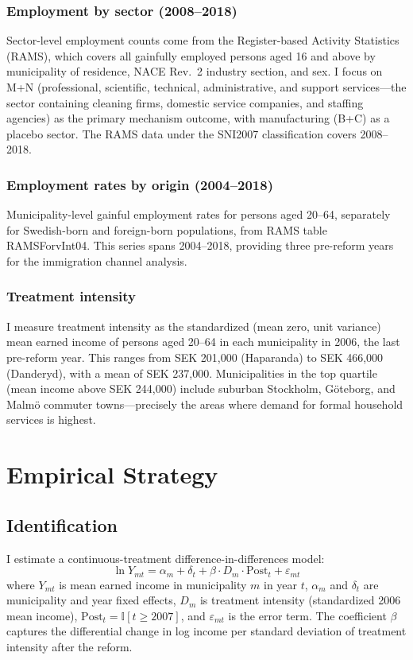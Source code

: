 \documentclass[12pt]{article}
\newcommand{\ind}{\mathbb{I}}
\begin{document}
\subsubsection*{Employment by sector (2008--2018)} Sector-level employment counts come from the Register-based Activity Statistics (RAMS), which covers all gainfully employed persons aged 16 and above by municipality of residence, NACE Rev.~2 industry section, and sex. I focus on M+N (professional, scientific, technical, administrative, and support services---the sector containing cleaning firms, domestic service companies, and staffing agencies) as the primary mechanism outcome, with manufacturing (B+C) as a placebo sector. The RAMS data under the SNI2007 classification covers 2008--2018.

\subsubsection*{Employment rates by origin (2004--2018)} Municipality-level gainful employment rates for persons aged 20--64, separately for Swedish-born and foreign-born populations, from RAMS table RAMSForvInt04. This series spans 2004--2018, providing three pre-reform years for the immigration channel analysis.

\subsubsection*{Treatment intensity} I measure treatment intensity as the standardized (mean zero, unit variance) mean earned income of persons aged 20--64 in each municipality in 2006, the last pre-reform year. This ranges from SEK 201,000 (Haparanda) to SEK 466,000 (Danderyd), with a mean of SEK 237,000. Municipalities in the top quartile (mean income above SEK 244,000) include suburban Stockholm, G\"{o}teborg, and Malm\"{o} commuter towns---precisely the areas where demand for formal household services is highest.




\section{Empirical Strategy}

\subsection{Identification}

I estimate a continuous-treatment difference-in-differences model:
\begin{equation}
\ln Y_{mt} = \alpha_m + \delta_t + \beta \cdot D_m \cdot \text{Post}_t + \varepsilon_{mt}
\label{eq:did}
\end{equation}
where $Y_{mt}$ is mean earned income in municipality $m$ in year $t$, $\alpha_m$ and $\delta_t$ are municipality and year fixed effects, $D_m$ is treatment intensity (standardized 2006 mean income), $\text{Post}_t = \ind[t \geq 2007]$, and $\varepsilon_{mt}$ is the error term. The coefficient $\beta$ captures the differential change in log income per standard deviation of treatment intensity after the reform.
\end{document}
